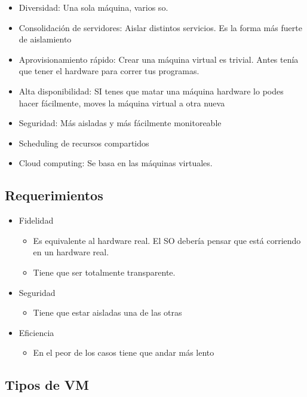 \documentclass{article}
\begin{document}
\begin{itemize}
\item
  Diversidad: Una sola máquina, varios so.
\item
  Consolidación de servidores: Aislar distintos servicios. Es la forma
  más fuerte de aislamiento
\item
  Aprovisionamiento rápido: Crear una máquina virtual es trivial. Antes
  tenía que tener el hardware para correr tus programas.
\item
  Alta disponibilidad: SI tenes que matar una máquina hardware lo podes
  hacer fácilmente, moves la máquina virtual a otra nueva
\item
  Seguridad: Más aisladas y más fácilmente monitoreable
\item
  Scheduling de recursos compartidos
\item
  Cloud computing: Se basa en las máquinas virtuales.
\end{itemize}

\subsection{Requerimientos}\label{requerimientos}

\begin{itemize}
\item
  Fidelidad

  \begin{itemize}
  \item
    Es equivalente al hardware real. El SO debería pensar que está
    corriendo en un hardware real.
  \item
    Tiene que ser totalmente transparente.
  \end{itemize}
\item
  Seguridad

  \begin{itemize}
  \item
    Tiene que estar aisladas una de las otras
  \end{itemize}
\item
  Eficiencia

  \begin{itemize}
  \item
    En el peor de los casos tiene que andar más lento
  \end{itemize}
\end{itemize}

\subsection{Tipos de VM}\label{tipos-de-vm}
\end{document}
